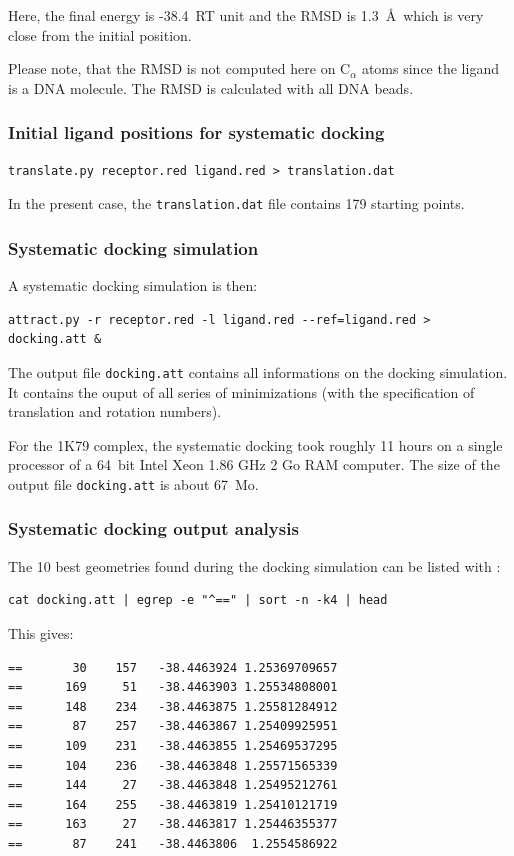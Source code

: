 \documentclass[12pt,a4paper]{article}
\begin{document}
Here, the final energy is -38.4~RT unit and the RMSD is 1.3~\AA\ which is very close from the initial position.

Please note, that the RMSD is not computed here on C$_{\alpha}$ atoms since the ligand is a DNA molecule. The RMSD is calculated with all DNA beads. 

\subsubsection{Initial ligand positions for systematic docking}
\begin{verbatim}
translate.py receptor.red ligand.red > translation.dat
\end{verbatim}

In the present case, the {\tt translation.dat} file contains 179 starting points.

\subsubsection{Systematic docking simulation}
A systematic docking simulation is then:
\begin{verbatim}
attract.py -r receptor.red -l ligand.red --ref=ligand.red > docking.att &
\end{verbatim}

The output file {\tt docking.att} contains all informations on the docking 
simulation. It contains the ouput of all series of minimizations 
(with the specification of translation and rotation numbers).

For the 1K79 complex, the systematic docking took roughly 11 hours on a single processor of a 64~bit Intel Xeon 1.86 GHz 2 Go RAM computer.
The size of the output file {\tt docking.att} is about 67~Mo.

\subsubsection{Systematic docking output analysis}
The 10 best geometries found during the docking simulation can be listed with :

\begin{verbatim}
cat docking.att | egrep -e "^==" | sort -n -k4 | head
\end{verbatim}

This gives:

\begin{verbatim}
==       30    157   -38.4463924 1.25369709657
==      169     51   -38.4463903 1.25534808001
==      148    234   -38.4463875 1.25581284912
==       87    257   -38.4463867 1.25409925951
==      109    231   -38.4463855 1.25469537295
==      104    236   -38.4463848 1.25571565339
==      144     27   -38.4463848 1.25495212761
==      164    255   -38.4463819 1.25410121719
==      163     27   -38.4463817 1.25446355377
==       87    241   -38.4463806  1.2554586922
\end{verbatim}
\end{document}
